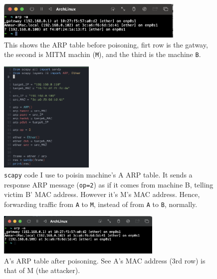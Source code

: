 \documentclass{article}
\def\c#1{\texttt{#1}}
\begin{document}
\begin{figure}[hb]
	\centering
	\includegraphics[width=0.8\textwidth]{figures/A-arp.png}
	\caption{This shows the ARP table before poisoning, firt row is the gatway, the second is MITM machin (\c{M}), and the third is the machine \c{B}.}
	\label{fig:A-arp}
\end{figure}
\begin{figure}[hb]
	\centering
	\includegraphics[width=0.4\textwidth]{figures/poisin-code.png}
	\caption{\c{scapy} code I use to poisin machine's A ARP table. It sends a response ARP message (\c{op=2}) as if it comes from machine B, telling victim B' MAC address. However it's M's MAC address. Hence, forwarding traffic from \c{A} to \c{M}, instead of from \c{A} to \c{B}, normally.}
	\label{fig:poisoning-code}
\end{figure}
\begin{figure}[hb]
	\centering
	\includegraphics[width=0.7\textwidth]{figures/A-arp-piosined.png}
	\caption{A's ARP table after poisoning. See A's MAC address (3rd row) is that of M (the attacker).}
	\label{fig:A-arp-piosined}
\end{figure}

\newpage
\end{document}
